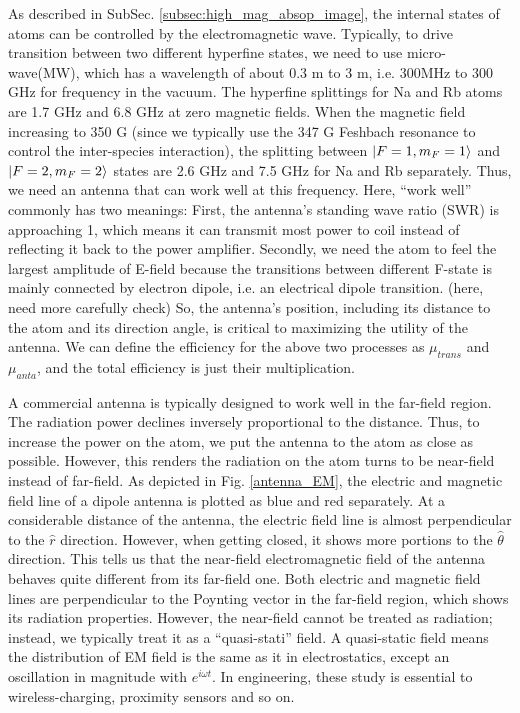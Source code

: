 As described in SubSec. \ref{subsec:high_mag_absop_image}, the internal states of atoms can be controlled by the electromagnetic wave. Typically, to drive transition between two different hyperfine states, we need to use micro-wave(MW), which has a wavelength of about 0.3 m to 3 m, i.e. 300MHz to 300 GHz for frequency in the vacuum. The hyperfine splittings for Na and Rb atoms are 1.7 GHz and 6.8 GHz at zero magnetic fields. When the magnetic field increasing to 350 G (since we typically use the 347 G Feshbach resonance to control the inter-species interaction), the splitting between $\ket{F=1,m_F=1}$ and $\ket{F=2, m_F=2}$ states are 2.6 GHz and 7.5 GHz for Na and Rb separately. Thus, we need an antenna that can work well at this frequency. Here, ``work well'' commonly has two meanings: First, the antenna's standing wave ratio (SWR) is approaching 1, which means it can transmit most power to coil instead of reflecting it back to the power amplifier. Secondly, we need the atom to feel the largest amplitude of E-field because the transitions between different F-state is mainly connected by electron dipole, i.e. an electrical dipole transition. (here, need more carefully check) So, the antenna's position, including its distance to the atom and its direction angle, is critical to maximizing the utility of the antenna. We can define the efficiency for the above two processes as $\mu_{trans}$ and $\mu_{anta}$, and the total efficiency is just their multiplication.

A commercial antenna is typically designed to work well in the far-field region. The radiation power declines inversely proportional to the distance. Thus, to increase the power on the atom, we put the antenna to the atom as close as possible. However, this renders the radiation on the atom turns to be near-field instead of far-field. As depicted in Fig. \ref{antenna_EM}, the electric and magnetic field line of a dipole antenna is plotted as blue and red separately. At a considerable distance of the antenna, the electric field line is almost perpendicular to the \(\hat{r}\) direction. However, when getting closed, it shows more portions to the \(\hat{\theta}\) direction. This tells us that the near-field electromagnetic field of the antenna behaves quite different from its far-field one. Both electric and magnetic field lines are perpendicular to the Poynting vector in the far-field region, which shows its radiation properties. However, the near-field cannot be treated as radiation; instead, we typically treat it as a ``quasi-stati'' field. A quasi-static field means the distribution of EM field is the same as it in electrostatics, except an oscillation in magnitude with \(e^{i\omega t}\). In engineering, these study is essential to wireless-charging, proximity sensors and so on.

